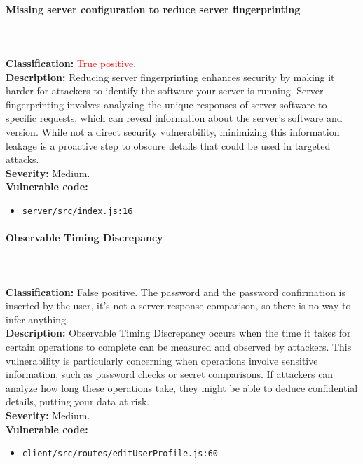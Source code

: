 \documentclass[]{article}
\begin{document}
\paragraph{Missing server configuration to reduce server fingerprinting} \mbox{} \\ \\
\textbf{Classification:} \textcolor{red}{True} \textcolor{red}{positive}. \\
\textbf{Description:} Reducing server fingerprinting enhances security by making it harder for attackers to identify the software your server is running. Server fingerprinting involves analyzing the unique responses of server software to specific requests, which can reveal information about the server's software and version. While not a direct security vulnerability, minimizing this information leakage is a proactive step to obscure details that could be used in targeted attacks. \\ 
\textbf{Severity:} Medium. \\ 
\textbf{Vulnerable code:}
\begin{itemize}
    \item \texttt{server/src/index.js:16}
\end{itemize}

\paragraph{Observable Timing Discrepancy} \mbox{} \\ \\
\textbf{Classification:} False positive. The password and the password confirmation is inserted by the user, it's not a server response comparison, so there is no way to infer anything. \\
\textbf{Description:} Observable Timing Discrepancy occurs when the time it takes for certain operations to complete can be measured and observed by attackers. This vulnerability is particularly concerning when operations involve sensitive information, such as password checks or secret comparisons. If attackers can analyze how long these operations take, they might be able to deduce confidential details, putting your data at risk. \\ 
\textbf{Severity:} Medium. \\ 
\textbf{Vulnerable code:}
\begin{itemize}
    \item \texttt{client/src/routes/editUserProfile.js:60}
\end{itemize}
\end{document}
